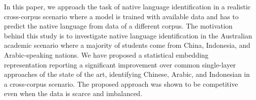 In this paper, we approach the task of native language identification in a realistic cross-corpus scenario where a model is trained with available data and has to predict the native language from data of a different corpus. The motivation behind this study is to investigate native language identification in the Australian academic scenario where a majority of students come from China, Indonesia, and Arabic-speaking nations.  We have proposed a statistical embedding representation reporting a significant improvement over common single-layer approaches of the state of the art, identifying Chinese, Arabic, and Indonesian in a cross-corpus scenario. The proposed approach was shown to be competitive even when the data is scarce and imbalanced.
